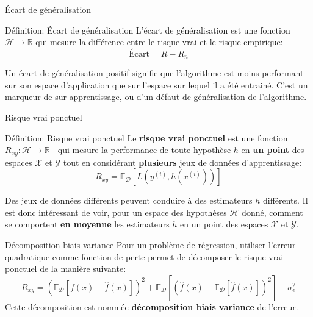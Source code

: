 \documentclass[10pt]{beamer}  %
\begin{document}
\begin{frame}{Écart de généralisation}
	\begin{block}{Définition: Écart de généralisation}
		L'écart de généralisation est une fonction $\mathcal{H} \to \mathbb{R}$ qui mesure la différence entre le risque vrai et le risque empirique:
		\begin{equation}
			\text{Écart} = R - R_n
			\nonumber
		\end{equation}
		\hfill
	\end{block}
	\pause
	Un écart de généralisation positif signifie que l'algorithme est moins performant sur son espace d'application que sur l'espace sur lequel il a été entrainé. C'est un marqueur de sur-apprentissage, ou d'un défaut de généralisation de l'algorithme.
\end{frame}

\begin{frame}{Risque vrai ponctuel}
	\begin{block}{Définition: Risque vrai ponctuel}
		Le \textbf{risque vrai ponctuel} est une fonction $R_{xy}: \mathcal{H} \to \mathbb{R}^+$ qui mesure la performance de toute hypothèse $h$ en \textbf{un point} des espaces $\mathcal{X}$ et $\mathcal{Y}$ tout en considérant \textbf{plusieurs} jeux de données d'apprentissage:
		\begin{equation}
			R_{xy} = \mathbb{E}_{\mathcal{D}}\left[L\left(y^{(i)}, h\left(x^{(i)}\right)\right)\right]
			\nonumber
		\end{equation}
		\hfill
	\end{block}
	\vspace{0.5cm}
	\pause
	Des jeux de données différents peuvent conduire à des estimateurs $h$ différents. Il est donc intéressant de voir, pour un espace des hypothèses $\mathcal{H}$ donné, comment se comportent \textbf{en moyenne} les estimateurs $h$ en un point des espaces $\mathcal{X}$ et $\mathcal{Y}$.
\end{frame}

\begin{frame}{Décomposition biais variance}
	Pour un problème de régression, utiliser l'erreur quadratique comme fonction de perte permet de décomposer le risque vrai ponctuel de la manière suivante:
	\begin{equation}
		R_{xy} = \left(\mathbb{E}_{\mathcal{D}}\left[f(x) - \hat{f}(x)\right]\right)^2 + \mathbb{E}_{\mathcal{D}}\left[\left(\hat{f}(x) - \mathbb{E}_{\mathcal{D}}\left[\hat{f}(x)\right]\right)^2\right] + \sigma_{\epsilon}^2
		\nonumber
	\end{equation}
	Cette décomposition est nommée \textbf{décomposition biais variance} de l'erreur.
\end{frame}
\end{document}
